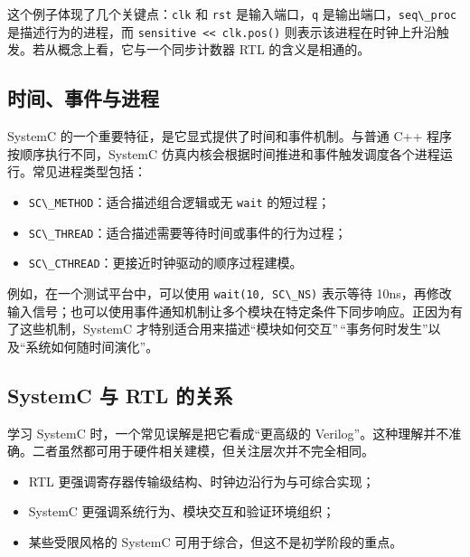这个例子体现了几个关键点：\passthrough{\lstinline!clk!} 和
\passthrough{\lstinline!rst!} 是输入端口，\passthrough{\lstinline!q!}
是输出端口，\passthrough{\lstinline!seq\_proc!} 是描述行为的进程，而
\passthrough{\lstinline!sensitive << clk.pos()!}
则表示该进程在时钟上升沿触发。若从概念上看，它与一个同步计数器 RTL
的含义是相通的。

\subsection{时间、事件与进程}\label{ux65f6ux95f4ux4e8bux4ef6ux4e0eux8fdbux7a0b}

SystemC 的一个重要特征，是它显式提供了时间和事件机制。与普通 C++
程序按顺序执行不同，SystemC
仿真内核会根据时间推进和事件触发调度各个进程运行。常见进程类型包括：

\begin{itemize}
\tightlist
\item
  \passthrough{\lstinline!SC\_METHOD!}：适合描述组合逻辑或无
  \passthrough{\lstinline!wait!} 的短过程；
\item
  \passthrough{\lstinline!SC\_THREAD!}：适合描述需要等待时间或事件的行为过程；
\item
  \passthrough{\lstinline!SC\_CTHREAD!}：更接近时钟驱动的顺序过程建模。
\end{itemize}

例如，在一个测试平台中，可以使用
\passthrough{\lstinline!wait(10, SC\_NS)!} 表示等待
10ns，再修改输入信号；也可以使用事件通知机制让多个模块在特定条件下同步响应。正因为有了这些机制，SystemC
才特别适合用来描述``模块如何交互''\,``事务何时发生''以及``系统如何随时间演化''。

\subsection{SystemC 与 RTL
的关系}\label{systemc-ux4e0e-rtl-ux7684ux5173ux7cfb}

学习 SystemC 时，一个常见误解是把它看成``更高级的
Verilog''。这种理解并不准确。二者虽然都可用于硬件相关建模，但关注层次并不完全相同。

\begin{itemize}
\tightlist
\item
  RTL 更强调寄存器传输级结构、时钟边沿行为与可综合实现；
\item
  SystemC 更强调系统行为、模块交互和验证环境组织；
\item
  某些受限风格的 SystemC 可用于综合，但这不是初学阶段的重点。
\end{itemize}

